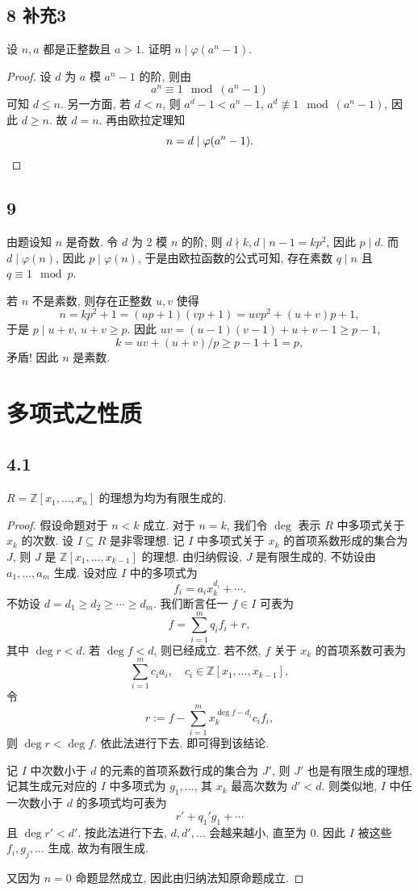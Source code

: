 \documentclass[12pt,a4paper,reqno]{amsart}
\theoremstyle{remark}
\newcommand{\Z}{\mathbb{Z}}
\renewcommand{\le}{\leqslant}
\renewcommand{\ge}{\geqslant}
\begin{document}
\subsection*{8 补充3}
设 $n,a$ 都是正整数且 $a>1$. 证明 $n\mid \varphi(a^n-1)$.
\begin{proof}
设 $d$ 为 $a$ 模 $a^n-1$ 的阶, 则由
  \[a^n\equiv 1\mod (a^n-1)\]
可知 $d\le n$. 另一方面, 若 $d<n$, 则 $a^d-1<a^n-1$, $a^d\not\equiv 1\mod (a^n-1)$, 因此 $d\ge n$. 故 $d=n$. 再由欧拉定理知 \[n=d\mid \varphi(a^n-1).\qedhere\]
\end{proof}

\subsection*{9}
由题设知 $n$ 是奇数. 令 $d$ 为 $2$ 模 $n$ 的阶, 则 $d\nmid k, d\mid n-1=kp^2$, 因此 $p\mid d$. 而 $d\mid \varphi(n)$, 因此 $p\mid \varphi(n)$, 于是由欧拉函数的公式可知, 存在素数 $q\mid n$ 且 $q\equiv 1\mod p$.

若 $n$ 不是素数, 则存在正整数 $u,v$ 使得
 \[n=kp^2+1=(up+1)(vp+1)=uvp^2+(u+v)p+1,\]
于是 $p\mid u+v$, $u+v\ge p$. 因此 $uv=(u-1)(v-1)+u+v-1\ge p-1$,
  \[k=uv+(u+v)/p\ge p-1+1=p,\]
矛盾! 因此 $n$ 是素数.

\section{多项式之性质}

\subsection*{4.1}
$R=\Z[x_1,\ldots,x_n]$ 的理想为均为有限生成的.
\begin{proof}
假设命题对于 $n<k$ 成立. 对于 $n=k$, 我们令 $\deg$ 表示 $R$ 中多项式关于 $x_k$ 的次数. 设 $I\subseteq R$ 是非零理想. 记 $I$ 中多项式关于 $x_k$ 的首项系数形成的集合为 $J$, 则 $J$ 是 $\Z[x_1,\ldots,x_{k-1}]$ 的理想. 由归纳假设, $J$ 是有限生成的, 不妨设由 $a_1,\ldots,a_m$ 生成. 设对应 $I$ 中的多项式为
  \[f_i=a_i x_k^{d_i}+\cdots.\]
不妨设 $d=d_1\ge d_2\ge \cdots\ge d_m$. 我们断言任一 $f\in I$ 可表为
  \[f=\sum_{i=1}^m q_i f_i+r,\]
其中 $\deg r<d$. 若 $\deg f<d$, 则已经成立. 若不然, $f$ 关于 $x_k$ 的首项系数可表为
  \[\sum_{i=1}^m c_i a_i,\quad c_i\in\Z[x_1,\ldots,x_{k-1}],\]
令
  \[r:=f-\sum_{i=1}^m x_k^{\deg f-d_i} c_i f_i,\]
则 $\deg r<\deg f$. 依此法进行下去, 即可得到该结论.

记 $I$ 中次数小于 $d$ 的元素的首项系数行成的集合为 $J'$, 则 $J'$ 也是有限生成的理想, 记其生成元对应的 $I$ 中多项式为 $g_1,\ldots$, 其 $x_k$ 最高次数为 $d'<d$. 则类似地, $I$ 中任一次数小于 $d$ 的多项式均可表为
  \[r'+q_1' g_1+\cdots\]
且 $\deg r'<d'$. 按此法进行下去, $d,d',\ldots$ 会越来越小, 直至为 $0$. 因此 $I$ 被这些 $f_i,g_j,\ldots$ 生成, 故为有限生成.

又因为 $n=0$ 命题显然成立, 因此由归纳法知原命题成立.
\end{proof}
\end{document}
